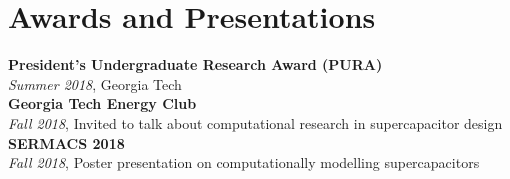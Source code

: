 \documentclass{tccv}
\begin{document}
\begin{minipage}[t]{0.35\textwidth}
    \section{Awards and Presentations}
    
    \textbf{President's Undergraduate Research Award (PURA)} \\
    \emph{Summer 2018}, Georgia Tech \\
    
    \textbf{Georgia Tech Energy Club} \\
    \emph{Fall 2018}, Invited to talk about computational research in supercapacitor design \\
    
    \textbf{SERMACS 2018} \\
    \emph{Fall 2018}, Poster presentation on computationally modelling supercapacitors
\end{minipage}
\begin{minipage}[t]{0.1\textwidth}
\end{minipage}
\end{document}
